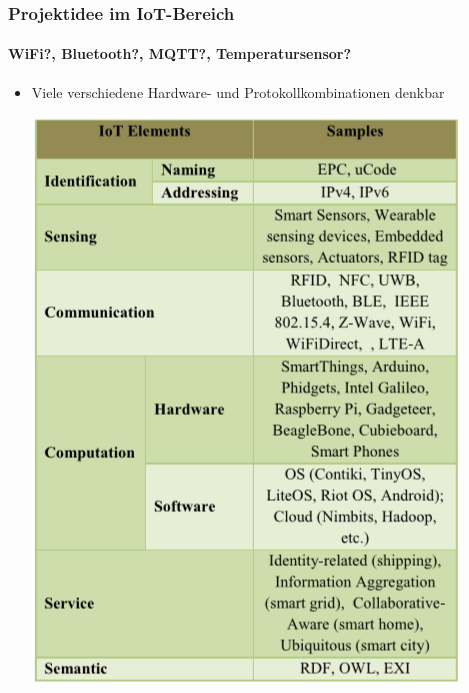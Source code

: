 \documentclass{beamer}
\begin{document}
\begin{frame}

\frametitle{Projektidee im IoT-Bereich}
\framesubtitle{WiFi?, Bluetooth?, MQTT?, Temperatursensor?}
\begin{itemize}
	\item Viele verschiedene Hardware- und Protokollkombinationen denkbar \begin{center}
		\includegraphics[scale=0.45]{images/iot_element.png}
	\end{center}
\end{itemize}

\end{frame}
\end{document}
